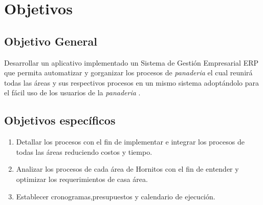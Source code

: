 \chapter{Objetivos}
\section{Objetivo General}
Desarrollar un aplicativo implementado un Sistema de Gesti\'on Empresarial ERP que permita automatizar y gorganizar los procesos de \emph{panaderia} el cual reunir\'a todas las \'areas y sus respectivos procesos en un mismo sistema adopt\'andolo para el f\'acil uso de los usuarios de la \emph{panaderia} .%
\section{Objetivos espec\'ificos}
\begin{enumerate}
\item Detallar los procesos con el fin de implementar e integrar los procesos de todas las \'areas reduciendo costos y tiempo.
\item Analizar los procesos de cada \'area de Hornitos con el fin de entender y optimizar los requerimientos de casa \'area.
\item Establecer cronogramas,presupuestos y calendario de ejecuci\'on.
\end{enumerate}